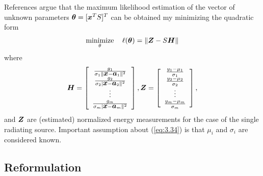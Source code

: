 References \cite{LiHu,ShengHu} argue that the maximum likelihood estimation of the vector of unknown parameters $\mbox{\boldmath${\theta}$} = [\mbox{\boldmath$x$}^T S]^T$ can be obtained my minimizing the quadratic form
\begin{equation} \label{eq:3.34}
\mathop{\mbox{minimize}}_\theta \quad \ell(\mbox{\boldmath${\theta}$}) = \|\mbox{\boldmath$Z$} - S\mbox{\boldmath$H$}\|
\end{equation}
where 
\begin{equation}
\nonumber
\mbox{\boldmath$H$} = \left[ \begin{array}{c}
\frac{g_1}{\sigma_1\|\mbox{\boldmath$x$} - \mbox{\boldmath$a$}_1 \|^2} \\
\frac{g_2}{\sigma_2|\mbox{\boldmath$x$} - \mbox{\boldmath$a$}_2 \|^2} \\
\vdots \\
\frac{g_m}{\sigma_m|\mbox{\boldmath$x$} - \mbox{\boldmath$a$}_m \|^2} \\
\end{array}
\right] ,
\nonumber
\mbox{\boldmath$Z$} = \left[ \begin{array}{c}
\frac{y_1 - \mu_1}{\sigma_1} \\
\frac{y_2 - \mu_2}{\sigma_2} \\
\vdots \\
\frac{y_m - \mu_m}{\sigma_m} \\
\end{array}
\right] ,
\end{equation}
and $\mbox{\boldmath$Z$}$ are (estimated) normalized energy measurements for the case of the single radiating source. Important assumption about (\ref{eq:3.34}) is that $\mu_i$ and $\sigma_i$ are considered known. 


\subsection{Reformulation}

